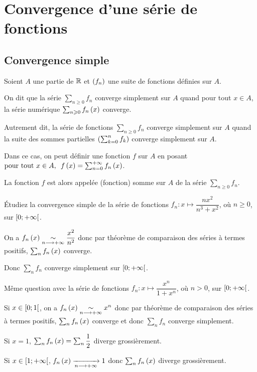 \section{Convergence d'une série de fonctions}

\subsection{Convergence simple}

\begin{defi}
Soient \(A\) une partie de \(\mathbb{R}\) et \(\left(f_n\right)\) une suite de fonctions définies sur \(A\).

On dit que la série \(\sum_{n\geq0}f_n\) converge simplement sur \(A\) quand pour tout \(x\in A\), la série numérique \(\sum_{n\geqslant0}f_n\left(x\right)\) converge.

Autrement dit, la série de fonctions \(\sum_{n\geq0}f_n\) converge simplement sur \(A\) quand la suite des sommes partielles \(\left(\sum_{k=0}^nf_k\right)\) converge simplement sur \(A\).

Dans ce cas, on peut définir une fonction \(f\) sur \(A\) en posant \(\quantifs{\tpt x\in A}f\paren{x}=\sum_{n=0}^{\pinf}f_n\paren{x}\).

La fonction \(f\) est alors appelée (fonction) somme sur \(A\) de la série \(\sum_{n\geq0}f_n\).
\end{defi}

\begin{exo}
Étudiez la convergence simple de la série de fonctions \(f_n:x\mapsto\dfrac{nx^2}{n^3+x^2}\), où \(n\geq0\), sur \(\left[0;+\infty\right[\).
\end{exo}

\begin{corr}
On a \(f_n\left(x\right)\underset{n\longrightarrow+\infty}{\sim}\dfrac{x^2}{n^2}\) donc par théorème de comparaison des séries à termes positifs, \(\sum_nf_n\left(x\right)\) converge.

Donc \(\sum_nf_n\) converge simplement sur \(\left[0;+\infty\right[\).
\end{corr}

\begin{exo}
Même question avec la série de fonctions \(f_n:x\mapsto\dfrac{x^n}{1+x^n}\), où \(n>0\), sur \(\left[0;+\infty\right[\).
\end{exo}

\begin{corr}
Si \(x\in\left[0;1\right[\), on a \(f_n\left(x\right)\underset{n\longrightarrow+\infty}{\sim}x^n\) donc par théorème de comparaison des séries à termes positifs, \(\sum_nf_n\left(x\right)\) converge et donc \(\sum_nf_n\) converge simplement.

Si \(x=1\), \(\sum_nf_n\left(x\right)=\sum_n\dfrac{1}{2}\) diverge grossièrement.

Si \(x\in\left[1;+\infty\right[\), \(f_n\left(x\right)\xrightarrow[n\longrightarrow+\infty]{}1\) donc \(\sum_nf_n\left(x\right)\) diverge grossièrement.
\end{corr}

